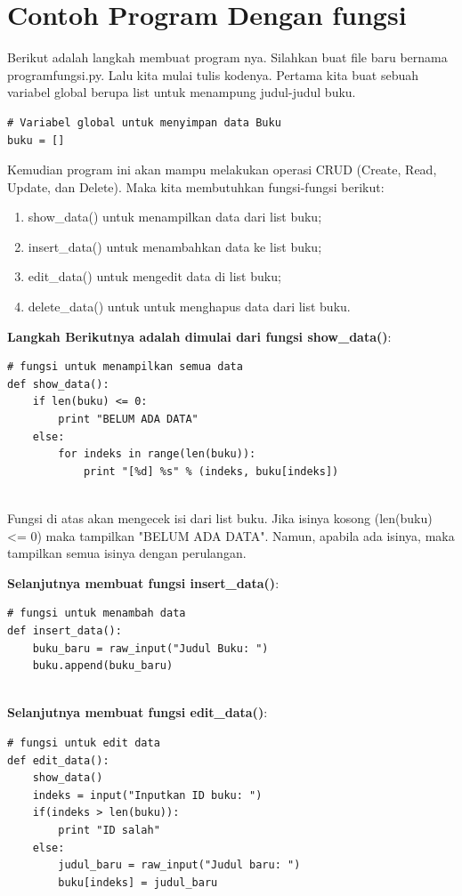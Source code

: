 \section{Contoh Program Dengan fungsi}
Berikut adalah langkah membuat program nya. Silahkan buat file baru bernama programfungsi.py. Lalu kita mulai tulis kodenya. Pertama kita buat sebuah variabel global berupa list untuk menampung judul-judul buku.
\begin{lstlisting}
# Variabel global untuk menyimpan data Buku
buku = []
\end{lstlisting}
Kemudian program ini akan mampu melakukan operasi CRUD (Create, Read, Update, dan Delete). Maka kita membutuhkan fungsi-fungsi berikut:
\begin{enumerate}
    \item show\_data() untuk menampilkan data dari list buku;
    \item insert\_data() untuk menambahkan data ke list buku;
    \item edit\_data() untuk mengedit data di list buku;
    \item delete\_data() untuk untuk menghapus data dari list buku.
\end{enumerate}
\par \textbf{Langkah Berikutnya adalah dimulai dari fungsi show\_data()}:
\begin{lstlisting}
# fungsi untuk menampilkan semua data
def show_data():
    if len(buku) <= 0:
        print "BELUM ADA DATA"
    else:
        for indeks in range(len(buku)):
            print "[%d] %s" % (indeks, buku[indeks])
            
\end{lstlisting}
Fungsi di atas akan mengecek isi dari list buku. Jika isinya kosong (len(buku) <= 0) maka tampilkan "BELUM ADA DATA". Namun, apabila ada isinya, maka tampilkan semua isinya dengan perulangan.
\par\textbf{Selanjutnya membuat fungsi insert\_data()}:
\begin{lstlisting}
# fungsi untuk menambah data
def insert_data():
    buku_baru = raw_input("Judul Buku: ")
    buku.append(buku_baru)
            
\end{lstlisting}
\par\textbf{Selanjutnya membuat fungsi edit\_data()}:
\begin{lstlisting}
# fungsi untuk edit data
def edit_data():
    show_data()
    indeks = input("Inputkan ID buku: ")
    if(indeks > len(buku)):
        print "ID salah"
    else:
        judul_baru = raw_input("Judul baru: ")
        buku[indeks] = judul_baru
\end{lstlisting}
